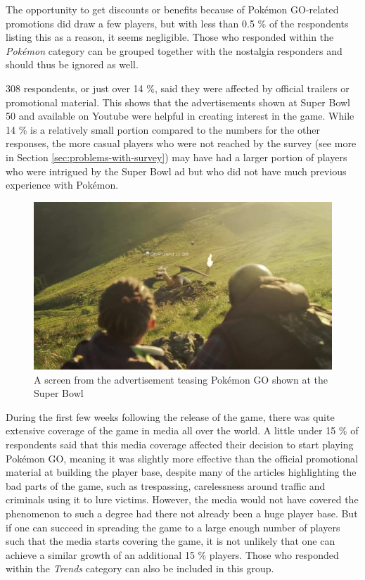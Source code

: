The opportunity to get discounts or benefits because of Pokémon GO-related promotions did draw a few players, but with less than 0.5 \% of the respondents listing this as a reason, it seems negligible. Those who responded within the \emph{Pokémon} category can be grouped together with the nostalgia responders and should thus be ignored as well.

308 respondents, or just over 14 \%, said they were affected by official trailers or promotional material. This shows that the advertisements shown at Super Bowl 50 and available on Youtube were helpful in creating interest in the game. While 14 \% is a relatively small portion compared to the numbers for the other responses, the more casual players who were not reached by the survey (see more in Section \ref{sec:problems-with-survey}) may have had a larger portion of players who were intrigued by the Super Bowl ad but who did not have much previous experience with Pokémon.

\begin{figure}[h]
	\centering
	\includegraphics[width=\textwidth]{Figures/pogo-trailer-charizard}
	\caption{A screen from the advertisement teasing Pokémon GO shown at the Super Bowl}
\end{figure}

During the first few weeks following the release of the game, there was quite extensive coverage of the game in media all over the world. A little under 15 \% of respondents said that this media coverage affected their decision to start playing Pokémon GO, meaning it was slightly more effective than the official promotional material at building the player base, despite many of the articles highlighting the bad parts of the game, such as trespassing, carelessness around traffic and criminals using it to lure victims. However, the media would not have covered the phenomenon to such a degree had there not already been a huge player base. But if one can succeed in spreading the game to a large enough number of players such that the media starts covering the game, it is not unlikely that one can achieve a similar growth of an additional 15 \% players. Those who responded within the \emph{Trends} category can also be included in this group.

